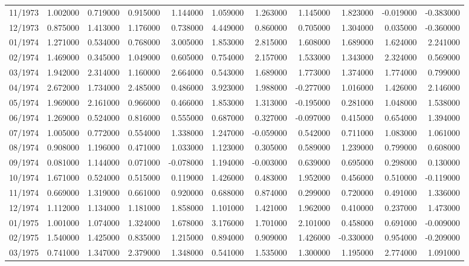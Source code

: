\begin{tabular}{lrrrrrrrrrr}
11/1973 & 1.002000 & 0.719000 & 0.915000 & 1.144000 & 1.059000 & 1.263000 & 1.145000 & 1.823000 & -0.019000 & -0.383000 \\
12/1973 & 0.875000 & 1.413000 & 1.176000 & 0.738000 & 4.449000 & 0.860000 & 0.705000 & 1.304000 & 0.035000 & -0.360000 \\
01/1974 & 1.271000 & 0.534000 & 0.768000 & 3.005000 & 1.853000 & 2.815000 & 1.608000 & 1.689000 & 1.624000 & 2.241000 \\
02/1974 & 1.469000 & 0.345000 & 1.049000 & 0.605000 & 0.754000 & 2.157000 & 1.533000 & 1.343000 & 2.324000 & 0.569000 \\
03/1974 & 1.942000 & 2.314000 & 1.160000 & 2.664000 & 0.543000 & 1.689000 & 1.773000 & 1.374000 & 1.774000 & 0.799000 \\
04/1974 & 2.672000 & 1.734000 & 2.485000 & 0.486000 & 3.923000 & 1.988000 & -0.277000 & 1.016000 & 1.426000 & 2.146000 \\
05/1974 & 1.969000 & 2.161000 & 0.966000 & 0.466000 & 1.853000 & 1.313000 & -0.195000 & 0.281000 & 1.048000 & 1.538000 \\
06/1974 & 1.269000 & 0.524000 & 0.816000 & 0.555000 & 0.687000 & 0.327000 & -0.097000 & 0.415000 & 0.654000 & 1.394000 \\
07/1974 & 1.005000 & 0.772000 & 0.554000 & 1.338000 & 1.247000 & -0.059000 & 0.542000 & 0.711000 & 1.083000 & 1.061000 \\
08/1974 & 0.908000 & 1.196000 & 0.471000 & 1.033000 & 1.123000 & 0.305000 & 0.589000 & 1.239000 & 0.799000 & 0.608000 \\
09/1974 & 0.081000 & 1.144000 & 0.071000 & -0.078000 & 1.194000 & -0.003000 & 0.639000 & 0.695000 & 0.298000 & 0.130000 \\
10/1974 & 1.671000 & 0.524000 & 0.515000 & 0.119000 & 1.426000 & 0.483000 & 1.952000 & 0.456000 & 0.510000 & -0.119000 \\
11/1974 & 0.669000 & 1.319000 & 0.661000 & 0.920000 & 0.688000 & 0.874000 & 0.299000 & 0.720000 & 0.491000 & 1.336000 \\
12/1974 & 1.112000 & 1.134000 & 1.181000 & 1.858000 & 1.101000 & 1.421000 & 1.962000 & 0.410000 & 0.237000 & 1.473000 \\
01/1975 & 1.001000 & 1.074000 & 1.324000 & 1.678000 & 3.176000 & 1.701000 & 2.101000 & 0.458000 & 0.691000 & -0.009000 \\
02/1975 & 1.540000 & 1.425000 & 0.835000 & 1.215000 & 0.894000 & 0.909000 & 1.426000 & -0.330000 & 0.954000 & -0.209000 \\
03/1975 & 0.741000 & 1.347000 & 2.379000 & 1.348000 & 0.541000 & 1.535000 & 1.300000 & 1.195000 & 2.774000 & 1.091000 \\

\end{tabular}
